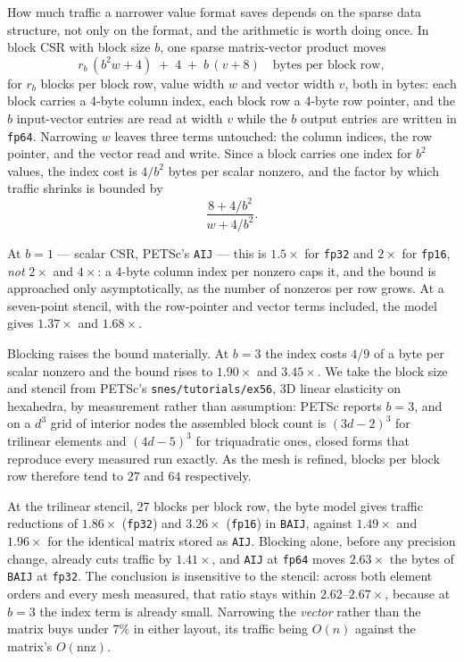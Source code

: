 \documentclass[11pt]{article}
\begin{document}
How much traffic a narrower value format saves depends on the sparse data
structure, not only on the format,
and the arithmetic is worth doing once. In block CSR with block size $b$, one
sparse matrix-vector product moves
\[
  r_b\,(b^2 w + 4) \;+\; 4 \;+\; b\,(v + 8) \quad\text{bytes per block row},
\]
for $r_b$ blocks per block row, value width $w$ and vector width $v$, both in
bytes: each block carries a 4-byte column index, each block row a 4-byte row
pointer, and the $b$ input-vector entries are read at width $v$ while the $b$
output entries are written in \texttt{fp64}. Narrowing $w$ leaves three terms
untouched: the column indices, the row pointer, and the vector read and write.
Since a block carries one index for $b^2$ values, the
index cost is $4/b^2$ bytes per scalar nonzero, and the factor by which traffic
shrinks is bounded by
\[
  \frac{8 + 4/b^2}{w + 4/b^2}.
\]

At $b=1$ --- scalar CSR, PETSc's \texttt{AIJ} --- this is $1.5\times$ for
\texttt{fp32} and $2\times$ for \texttt{fp16}, \emph{not} $2\times$ and
$4\times$: a 4-byte column index per nonzero caps it, and the bound is approached
only asymptotically, as the number of nonzeros per row grows. At a seven-point
stencil, with the row-pointer and vector terms included, the model gives
$1.37\times$ and $1.68\times$.

Blocking raises the bound materially. At $b=3$ the index costs $4/9$ of a byte per
scalar nonzero and the bound rises to $1.90\times$ and $3.45\times$. We take the
block size and stencil from PETSc's \texttt{snes/tutorials/ex56}, 3D linear
elasticity on hexahedra, by measurement rather than assumption: PETSc reports
$b = 3$, and on a $d^3$ grid of interior nodes the assembled block count is
$(3d-2)^3$ for trilinear elements and $(4d-5)^3$ for triquadratic ones, closed
forms that reproduce every measured run exactly. As the mesh is refined, blocks
per block row therefore tend to $27$ and $64$ respectively.

At the trilinear stencil, 27 blocks per block row, the byte model gives traffic
reductions of $1.86\times$ (\texttt{fp32}) and $3.26\times$ (\texttt{fp16}) in
\texttt{BAIJ}, against $1.49\times$ and $1.96\times$ for the identical matrix
stored as \texttt{AIJ}. Blocking alone, before any precision change, already cuts
traffic by $1.41\times$, and \texttt{AIJ} at \texttt{fp64} moves $2.63\times$
the bytes of \texttt{BAIJ} at \texttt{fp32}. The conclusion is insensitive to
the stencil:
across both element orders and every mesh measured, that ratio stays within
$2.62$--$2.67\times$, because at $b = 3$ the index term is already small.
Narrowing the \emph{vector} rather than
the matrix buys under $7\%$ in either layout, its traffic being $O(n)$ against
the matrix's $O(\mathrm{nnz})$.
\end{document}
